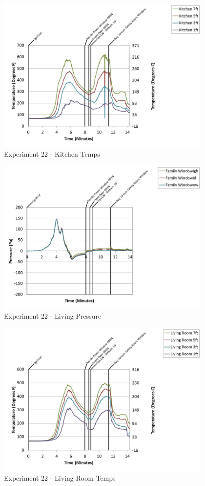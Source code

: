 \documentclass{article}
\begin{document}
\begin{appendices}
	\begin{figure}[h!]
		\centering
		\includegraphics[height=3.05in]{0_Images/Results_Charts/Exp_22_Charts/KitchenTemps.pdf}
		\caption{Experiment 22 - Kitchen Temps}
	\end{figure}
 
	\clearpage

	\begin{figure}[h!]
		\centering
		\includegraphics[height=3.05in]{0_Images/Results_Charts/Exp_22_Charts/LivingPressure.pdf}
		\caption{Experiment 22 - Living Pressure}
	\end{figure}
 

	\begin{figure}[h!]
		\centering
		\includegraphics[height=3.05in]{0_Images/Results_Charts/Exp_22_Charts/LivingRoomTemps.pdf}
		\caption{Experiment 22 - Living Room Temps}
	\end{figure}
 

\end{appendices}
\end{document}
